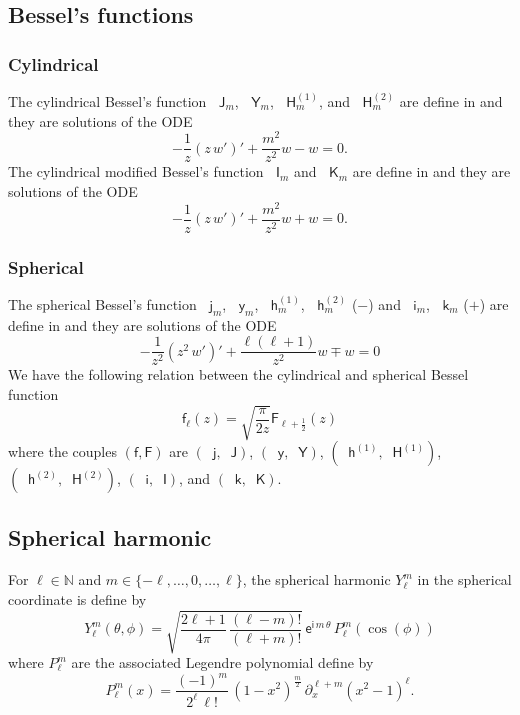 \documentclass[12pt,a4paper]{article}
\theoremstyle{definition}
\theoremstyle{plain}
\theoremstyle{remark}
\newcommand{\bbN}{\mathbb{N}}
\newcommand{\ex}{\mathsf{e}}
\newcommand{\im}{\mathsf{i}}
\newcommand{\bJ}{\mathop{}\!\mathsf{J}}
\newcommand{\bY}{\mathop{}\!\mathsf{Y}}
\newcommand{\Hu}{\mathop{}\!\mathsf{H}^{(1)}}
\newcommand{\Hd}{\mathop{}\!\mathsf{H}^{(2)}}
\newcommand{\bI}{\mathop{}\!\mathsf{I}}
\newcommand{\bK}{\mathop{}\!\mathsf{K}}
\newcommand{\bj}{\mathop{}\!\mathsf{j}}
\newcommand{\by}{\mathop{}\!\mathsf{y}}
\newcommand{\hu}{\mathop{}\!\mathsf{h}^{(1)}}
\newcommand{\hd}{\mathop{}\!\mathsf{h}^{(2)}}
\newcommand{\bi}{\mathop{}\!\mathsf{i}}
\newcommand{\bk}{\mathop{}\!\mathsf{k}}
\newcommand{\plr}[1]{\left(#1\right)}
\begin{document}
\subsection{Bessel's functions}

%
\subsubsection{Cylindrical}
%

The cylindrical Bessel's function \(\bJ_m\), \(\bY_m\), \(\Hu_m\), and \(\Hd_m\) are define in \cite[Sec.~10.2]{NIST:DLMF} and they are solutions of the ODE
\[
    -\frac{1}{z}\plr{z\, w'}' + \frac{m^2}{z^2}w - w = 0.
\]
The cylindrical modified Bessel's function \(\bI_m\) and \(\bK_m\) are define in \cite[Sec.~10.25]{NIST:DLMF} and they are solutions of the ODE
\[
    -\frac{1}{z}\plr{z\, w'}' + \frac{m^2}{z^2}w + w = 0.
\]

%
\subsubsection{Spherical}
%

The spherical Bessel's function \(\bj_m\), \(\by_m\), \(\hu_m\), \(\hd_m\) ($-$) and \(\bi_m\), \(\bk_m\) ($+$) are define in \cite[Sec.~10.47]{NIST:DLMF} and they are solutions of the ODE
\[
    -\frac{1}{z^2}\plr{z^2\, w'}' + \frac{\ell(\ell+1)}{z^2}w \mp w = 0
\]
We have the following relation between the cylindrical and spherical Bessel function
\[
    \mathsf{f}_\ell(z) = \sqrt{\frac{\pi}{2z}} \mathsf{F}_{\ell+\frac{1}{2}}(z)
\]
where the couples \((\mathsf{f}, \mathsf{F})\) are \((\bj, \bJ)\), \((\by, \bY)\), \((\hu, \Hu)\), \((\hd, \Hd)\), \((\bi, \bI)\), and \((\bk, \bK)\).

\subsection{Spherical harmonic}

For \(\ell \in \bbN\) and \(m \in \{-\ell, \ldots, 0, \ldots, \ell\}\), the spherical harmonic \(Y_\ell^m\) in the spherical coordinate is define by
\[
    Y_\ell^m(\theta, \phi) = \sqrt{\frac{2\ell+1}{4\pi}\, \frac{(\ell-m)!
        }{(\ell+m)!}}\, \ex^{\im\, m\, \theta}\, P_\ell^m(\cos(\phi))
\]
where \(P_\ell^m\) are the associated Legendre polynomial define by
\[
    P_\ell^m(x) = \frac{(-1)^m}{2^\ell\, \ell!}\, (1-x^2)^{\frac{m}{2}}\, \partial_x^{\ell+m} (x^2-1)^\ell.
\]
\end{document}
